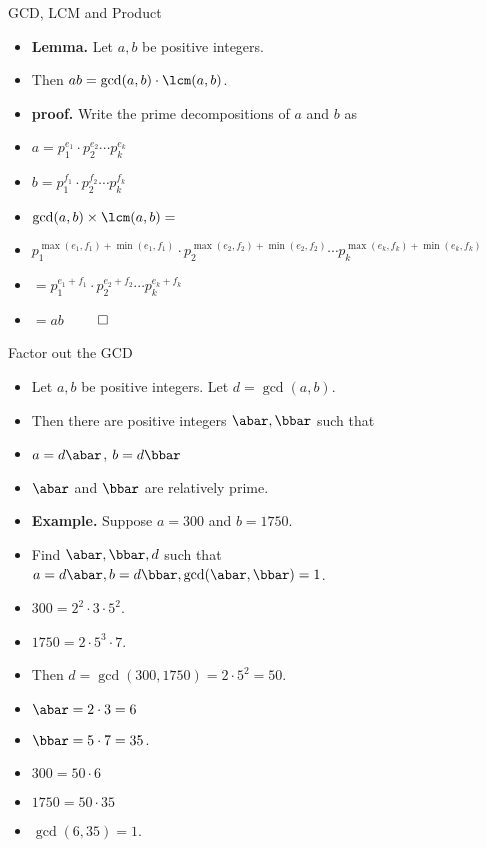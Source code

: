 \documentclass{beamer}
\begin{document}
\begin{frame}{GCD, LCM and Product}

\begin{itemize}
  \item \textbf{Lemma.} Let $a,b$ be positive integers.
  \item Then $ab = \gcd(a,b) \cdot \lcm(a,b)$.
  \item \textbf{proof.} Write the prime decompositions of $a$ and $b$ as
  \item $a=p_1^{e_1} \cdot p_2^{e_2} \cdots p_k^{e_k}$
  \item $b=p_1^{f_1} \cdot p_2^{f_2} \cdots p_k^{f_k}$
  \item $\gcd(a,b)\times \lcm(a,b) =$
  \item $p_1^{\max(e_1,f_1)+\min(e_1,f_1)} \cdot p_2^{\max(e_2,f_2)+\min(e_2,f_2)} \cdots p_k^{\max(e_k,f_k)+\min(e_k,f_k)}$
  \item $=p_1^{e_1+f_1} \cdot p_2^{e_2+f_2} \cdots p_k^{e_k+f_k}$
  \item $=ab$ $\qed$
\end{itemize}

\end{frame}

\begin{frame}{Factor out the GCD}

\begin{itemize}
  \item Let $a,b$ be positive integers. Let $d=\gcd(a,b)$.
  \item Then there are positive integers $\abar,\bbar$ such that
  \item $a=d\abar$, $b=d\bbar$
  \item $\abar$ and $\bbar$ are relatively prime.
  \item \textbf{Example.} Suppose $a=300$ and $b=1750$.
  \item Find $\abar,\bbar, d$ such that $a=d\abar, b=d\bbar, \gcd(\abar,\bbar)=1$.
  \item $300=2^2\cdot 3 \cdot 5^2$.
  \item $1750=2 \cdot 5^3 \cdot 7$.
  \item Then $d=\gcd(300,1750) = 2\cdot 5^2 = 50$.
  \item $\abar = 2\cdot 3 = 6$
  \item $\bbar = 5 \cdot 7 = 35$.
  \item $300 = 50 \cdot 6$
  \item $1750 = 50 \cdot 35$
  \item $\gcd(6,35) = 1$.
\end{itemize}

\end{frame}
\end{document}
